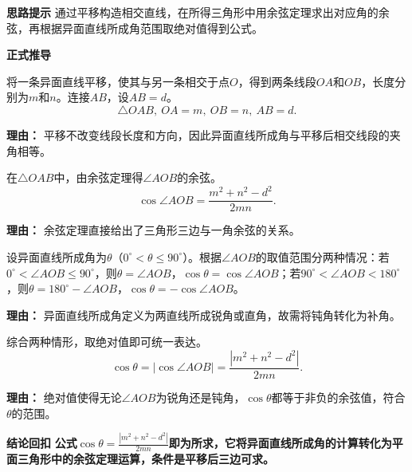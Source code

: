 \begin{proofbox}
	\textbf{\textcolor{CProof}{思路提示}}
	通过平移构造相交直线，在所得三角形中用余弦定理求出对应角的余弦，再根据异面直线所成角范围取绝对值得到公式。

	\medskip
	\textbf{\textcolor{CProof}{正式推导}}
	\begin{description}[style=nextline, leftmargin=2.8em, labelsep=0.5em, itemsep=0.55em]
		\item[\textbf{步骤一（平移构造）：}]
			将一条异面直线平移，使其与另一条相交于点$O$，得到两条线段$OA$和$OB$，长度分别为$m$和$n$。连接$AB$，设$AB=d$。
			\[
				\triangle OAB,\ OA=m,\ OB=n,\ AB=d.
			\]
			\par\textbf{理由：} 平移不改变线段长度和方向，因此异面直线所成角与平移后相交线段的夹角相等。
		\item[\textbf{步骤二（余弦定理）：}]
			在$\triangle OAB$中，由余弦定理得$\angle AOB$的余弦。
			\[
				\cos\angle AOB = \frac{m^2+n^2-d^2}{2mn}.
			\]
			\par\textbf{理由：} 余弦定理直接给出了三角形三边与一角余弦的关系。
		\item[\textbf{步骤三（角度关系）：}]
			设异面直线所成角为$\theta$（$0^\circ<\theta\le90^\circ$）。根据$\angle AOB$的取值范围分两种情况：若$0^\circ<\angle AOB\le90^\circ$，则$\theta=\angle AOB$，$\cos\theta=\cos\angle AOB$；若$90^\circ<\angle AOB<180^\circ$，则$\theta=180^\circ-\angle AOB$，$\cos\theta=-\cos\angle AOB$。
			\par\textbf{理由：} 异面直线所成角定义为两直线所成锐角或直角，故需将钝角转化为补角。
		\item[\textbf{步骤四（统一公式）：}]
			综合两种情形，取绝对值即可统一表达。
			\[
				\cos\theta = |\cos\angle AOB| = \frac{|m^2+n^2-d^2|}{2mn}.
			\]
			\par\textbf{理由：} 绝对值使得无论$\angle AOB$为锐角还是钝角，$\cos\theta$都等于非负的余弦值，符合$\theta$的范围。
	\end{description}

	\medskip
	\textbf{\textcolor{CProof}{结论回扣}}
	\textbf{公式$\displaystyle\cos\theta = \frac{|m^2+n^2-d^2|}{2mn}$即为所求，它将异面直线所成角的计算转化为平面三角形中的余弦定理运算，条件是平移后三边可求。}
\end{proofbox}
